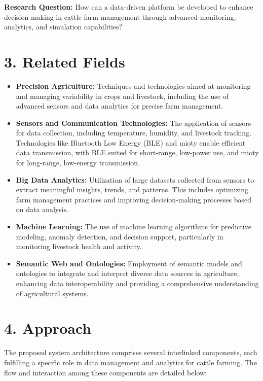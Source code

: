 \documentclass[11pt]{article}
\begin{document}
\textbf{Research Question:} How can a data-driven platform be developed to enhance decision-making in cattle farm management through advanced monitoring, analytics, and simulation capabilities?

\section*{3. Related Fields}
\begin{itemize}
    \item \textbf{Precision Agriculture:} Techniques and technologies aimed at monitoring and managing variability in crops and livestock, including the use of advanced sensors and data analytics for precise farm management.
    \item \textbf{Sensors and Communication Technologies:} The application of sensors for data collection, including temperature, humidity, and livestock tracking. Technologies like Bluetooth Low Energy (BLE) and mioty enable efficient data transmission, with BLE suited for short-range, low-power use, and mioty for long-range, low-energy transmission.
    \item \textbf{Big Data Analytics:} Utilization of large datasets collected from sensors to extract meaningful insights, trends, and patterns. This includes optimizing farm management practices and improving decision-making processes based on data analysis.
    \item \textbf{Machine Learning:} The use of machine learning algorithms for predictive modeling, anomaly detection, and decision support, particularly in monitoring livestock health and activity.
    \item \textbf{Semantic Web and Ontologies:} Employment of semantic models and ontologies to integrate and interpret diverse data sources in agriculture, enhancing data interoperability and providing a comprehensive understanding of agricultural systems.
\end{itemize}

\section*{4. Approach}
The proposed system architecture comprises several interlinked components, each fulfilling a specific role in data management and analytics for cattle farming. The flow and interaction among these components are detailed below:
\end{document}
